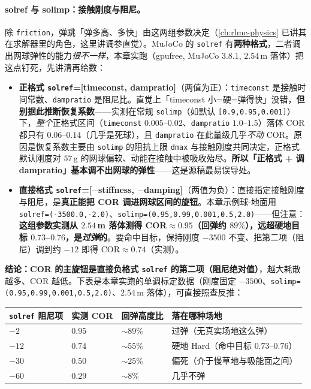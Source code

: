 \paragraph{solref 与 solimp：接触刚度与阻尼。}除 \verb|friction|，弹跳「弹多高、多快」由这两组参数决定（\cref{ch:rlmc-physics} 已讲其在求解器里的角色，这里讲调参直觉）。MuJoCo 的 \verb|solref| 有\textbf{两种格式}，二者调出网球弹性的能力\emph{很不一样}，本章实跑（gpufree, MuJoCo 3.8.1, $2.54$\,m 落体）把这点钉死，先讲清再给数：
\begin{itemize}
  \item \textbf{正格式 \texttt{solref}=[timeconst, dampratio]}（两值为正）：\verb|timeconst| 是接触时间常数、\verb|dampratio| 是阻尼比。直觉上「timeconst 小=硬=弹得快」没错，\textbf{但别据此推断恢复系数}——实测在常规 \verb|solimp|（如默认 \verb|[0.9,0.95,0.001]|）下，\emph{整个}正格式区间（\verb|timeconst| $0.005$--$0.02$、\verb|dampratio| $1.0$--$1.5$）落体 COR 都只有 $0.06$--$0.14$（几乎是死球），且 \verb|dampratio| 在此量级几乎\emph{不动} COR。原因是恢复系数主要由 \verb|solimp| 的阻抗上限 \verb|dmax| 与接触刚度共同决定，正格式默认刚度对 $57$\,g 的网球偏软、动能在接触中被吸收殆尽。\textbf{所以「正格式 + 调 dampratio」基本调不出网球的弹性}——这是源稿最易误导处。
  \item \textbf{直接格式 \texttt{solref}=[$-$stiffness, $-$damping]}（两值为负）：直接指定接触刚度与阻尼，是\textbf{真正能把 COR 调进网球区间的旋钮}。本章示例球-地面用 \texttt{solref=(-3500.0,-2.0)}、\texttt{solimp=(0.95,0.99,0.001,0.5,2.0)}——但注意：\textbf{这组参数实测从 $2.54$\,m 落体测得 COR$\approx0.95$（回弹约 $89\%$），远超硬地目标 $0.73$--$0.76$，是\emph{过弹}的}。要命中目标，保持刚度 $-3500$ 不变、把第二项（阻尼）调到约 $-12$ 即得 COR$\approx0.74$（实测）。
\end{itemize}
\textbf{结论：COR 的主旋钮是直接负格式 \texttt{solref} 的第二项（阻尼绝对值）}，越大耗散越多、COR 越低。下表是本章实跑的单调标定数据（刚度固定 $-3500$、\verb|solimp=(0.95,0.99,0.001,0.5,2.0)|、$2.54$\,m 落体），可直接照查反推：

\begin{center}
\small
\begin{tabular}{@{}llll@{}}
\toprule
\verb|solref| 阻尼项 & 实测 COR & 回弹高度比 & 落在哪种场地 \\
\midrule
$-2$  & $0.95$ & $\sim89\%$ & 过弹（无真实场地这么弹） \\
$-12$ & $0.74$ & $\sim55\%$ & 硬地 Hard（命中目标 $0.73$--$0.76$） \\
$-30$ & $0.50$ & $\sim25\%$ & 偏死（介于慢草地与吸能面之间） \\
$-60$ & $0.29$ & $\sim8\%$  & 几乎不弹 \\
\bottomrule
\end{tabular}
\end{center}

